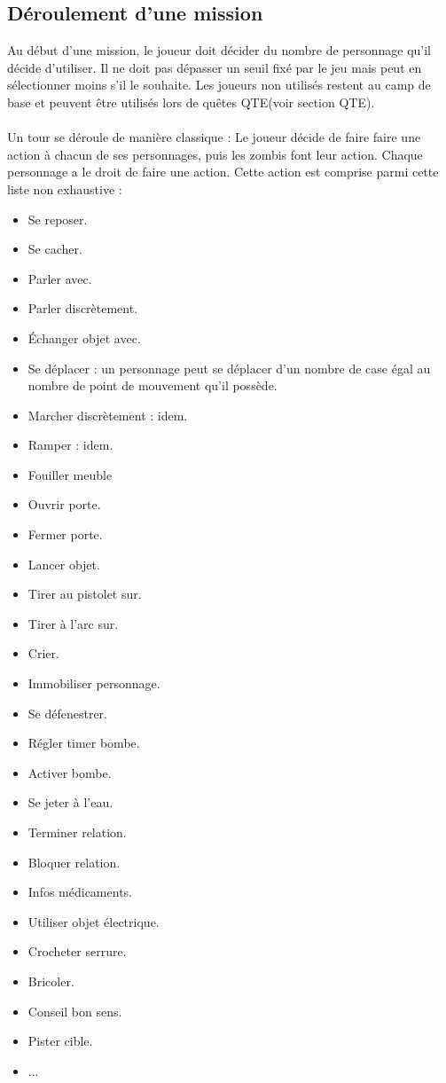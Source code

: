 \subsection{Déroulement d'une mission}
Au début d'une mission, le joueur doit décider du nombre de personnage qu'il décide d'utiliser. Il ne doit pas dépasser un seuil fixé par le jeu mais peut en sélectionner moins s'il le souhaite. Les joueurs non utilisés restent au camp de base et peuvent être utilisés lors de quêtes QTE(voir section QTE).
\\\\
Un tour se déroule de manière classique : Le joueur décide de faire faire une action à chacun de ses personnages, puis les zombis font leur action. Chaque personnage a le droit de faire une action. Cette action est comprise parmi cette liste non exhaustive :
\begin{itemize}
  \item Se reposer.
  \item Se cacher.
  \item Parler avec.
  \item Parler discrètement.
  \item Échanger objet avec.
  \item Se déplacer : un personnage peut se déplacer d'un nombre de case égal au nombre de point de mouvement qu'il possède.
  \item Marcher discrètement : idem.
  \item Ramper : idem.
  \item Fouiller meuble
  \item Ouvrir porte.
  \item Fermer porte.
  \item Lancer objet.
  \item Tirer au pistolet sur.
  \item Tirer à l'arc sur.
  \item Crier.
  \item Immobiliser personnage.
  \item Se défenestrer.
  \item Régler timer bombe.
  \item Activer bombe.
  \item Se jeter à l'eau.
  \item Terminer relation.
  \item Bloquer relation.
  \item Infos médicaments.
  \item Utiliser objet électrique.
  \item Crocheter serrure.
  \item Bricoler.
  \item Conseil bon sens.
  \item Pister cible.
  \item ...
\end{itemize}
